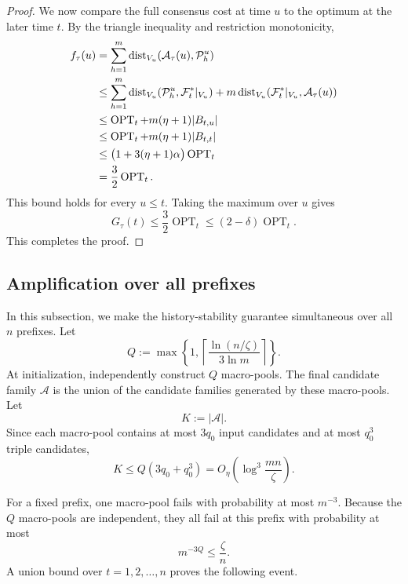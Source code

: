 \documentclass[11pt]{article}
\theoremstyle{definition}
\theoremstyle{remark}
\newcommand{\A}{\mathcal A}
\newcommand{\F}{\mathcal F}
\newcommand{\Pp}{\mathcal P}
\newcommand{\OPT}{\operatorname{OPT}}
\newcommand{\dist}{\operatorname{dist}}
\newcommand{\1}{\mathbf 1}
\begin{document}
\begin{proof}
We now compare the full consensus cost at time $u$ to the optimum at the
later time $t$.  By the triangle inequality and restriction monotonicity,
\begin{align}
 f_\tau(u)
 &=\sum_{h=1}^m\dist_{V_u}(\A_\tau(u),\Pp_h^u)\notag\\
 &\le
 \sum_{h=1}^m\dist_{V_u}(\Pp_h^u,\F_t^*|_{V_u})
 +m\dist_{V_u}(\F_t^*|_{V_u},\A_\tau(u))\notag\\
 &\le
 \OPT_t+m(\eta+1)|B_{t,u}|\notag\\
 &\le
 \OPT_t+m(\eta+1)|B_{t,t}|\notag\\
 &\le
 \bigl(1+3(\eta+1)\alpha\bigr)\OPT_t\notag\\
 &=\frac32\OPT_t.                         \label{eq:history-triple-final}
\end{align}
This bound holds for every $u\le t$.  Taking the maximum over $u$ gives
\[
 G_\tau(t)\le\frac32\OPT_t\le(2-\delta)\OPT_t.
\]
This completes the proof.
\end{proof}

\subsection{Amplification over all prefixes}

In this subsection, we make the history-stability guarantee simultaneous
over all $n$ prefixes.  Let
\begin{equation}\label{eq:Q-definition}
 Q
 :=
 \max\left\{
  1,
  \left\lceil\frac{\ln(n/\zeta)}{3\ln m}\right\rceil
 \right\}.
\end{equation}
At initialization, independently construct $Q$ macro-pools.  The final
candidate family $\A$ is the union of the candidate families generated by
these macro-pools.  Let
\begin{equation}\label{eq:K-definition}
 K:=|\A|.
\end{equation}
Since each macro-pool contains at most $3q_0$ input candidates and at most
$q_0^3$ triple candidates,
\begin{equation}\label{eq:K-bound}
 K\le Q(3q_0+q_0^3)
 =O_\eta\!\left(\log^3\!\frac{mn}{\zeta}\right).
\end{equation}

For a fixed prefix, one macro-pool fails with probability at most $m^{-3}$.
Because the $Q$ macro-pools are independent, they all fail at this prefix
with probability at most
\[
 m^{-3Q}\le\frac{\zeta}{n}.
\]
A union bound over $t=1,2,\ldots,n$ proves the following event.
\end{document}
